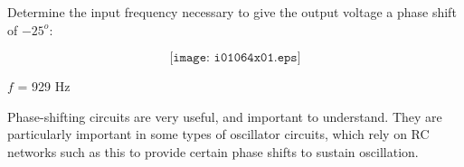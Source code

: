 

Determine the input frequency necessary to give the output voltage a phase shift of $-25^{o}$:

$$\texttt{[image: i01064x01.eps]}$$







$f$ = 929 Hz







Phase-shifting circuits are very useful, and important to understand.  They are particularly important in some types of oscillator circuits, which rely on RC networks such as this to provide certain phase shifts to sustain oscillation.




